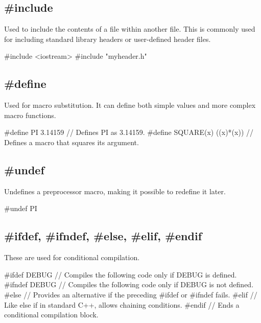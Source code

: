 \documentclass{report}
\begin{document}
    \subsection{\#include}
    \bigbreak \noindent 
    Used to include the contents of a file within another file. This is commonly used for including standard library headers or user-defined header files.
    \bigbreak \noindent 
    
    \begin{cppcode}
#include <iostream>
#include "myheader.h"
    \end{cppcode}
    

    \bigbreak \noindent 
    \subsection{\#define}
    \bigbreak \noindent 
    Used for macro substitution. It can define both simple values and more complex macro functions.
    \bigbreak \noindent 
    
    \begin{cppcode}
#define PI 3.14159 // Defines PI as 3.14159.
#define SQUARE(x) ((x)*(x)) // Defines a macro that squares its argument.
    \end{cppcode}
    

    \bigbreak \noindent 
    \subsection{\#undef}
    \bigbreak \noindent 
    Undefines a preprocessor macro, making it possible to redefine it later.
    \bigbreak \noindent 
    
    \begin{cppcode}
#undef PI
    \end{cppcode}
    

    \bigbreak \noindent 
    \subsection{\#ifdef, \#ifndef, \#else, \#elif, \#endif}
    \bigbreak \noindent 
    These are used for conditional compilation.
    \bigbreak \noindent 
    
    \begin{cppcode}
#ifdef DEBUG // Compiles the following code only if DEBUG is defined.
#ifndef DEBUG // Compiles the following code only if DEBUG is not defined.
#else // Provides an alternative if the preceding #ifdef or #ifndef fails.
#elif // Like else if in standard C++, allows chaining conditions.
#endif // Ends a conditional compilation block.
    \end{cppcode}
    
\end{document}
